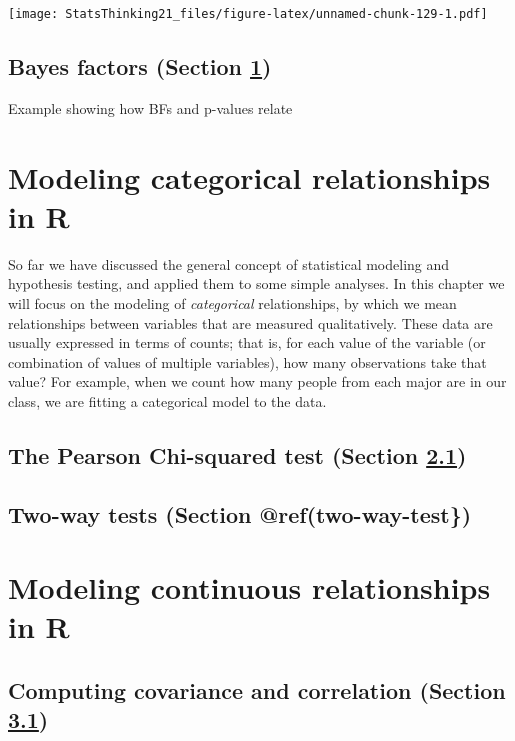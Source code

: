 \documentclass[
  12pt,
]{book}
\begin{document}
\texttt{[image: StatsThinking21\_files/figure-latex/unnamed-chunk-129-1.pdf]}

\hypertarget{Bayes-factors}{%
\section{Bayes factors (Section \ref{Bayes-factors})}\label{Bayes-factors}}

Example showing how BFs and p-values relate

\hypertarget{modeling-categorical-relationships-in-r}{%
\chapter{Modeling categorical relationships in R}\label{modeling-categorical-relationships-in-r}}

So far we have discussed the general concept of statistical modeling and hypothesis testing, and applied them to some simple analyses. In this chapter we will focus on the modeling of \emph{categorical} relationships, by which we mean relationships between variables that are measured qualitatively. These data are usually expressed in terms of counts; that is, for each value of the variable (or combination of values of multiple variables), how many observations take that value? For example, when we count how many people from each major are in our class, we are fitting a categorical model to the data.

\hypertarget{chi-squared-test}{%
\section{The Pearson Chi-squared test (Section \ref{chi-squared-test})}\label{chi-squared-test}}

\hypertarget{two-way-test}{%
\section{Two-way tests (Section @ref(two-way-test\})}\label{two-way-test}}

\hypertarget{modeling-continuous-relationships-in-r}{%
\chapter{Modeling continuous relationships in R}\label{modeling-continuous-relationships-in-r}}

\hypertarget{covariance-and-correlation}{%
\section{Computing covariance and correlation (Section \ref{covariance-and-correlation})}\label{covariance-and-correlation}}
\end{document}
